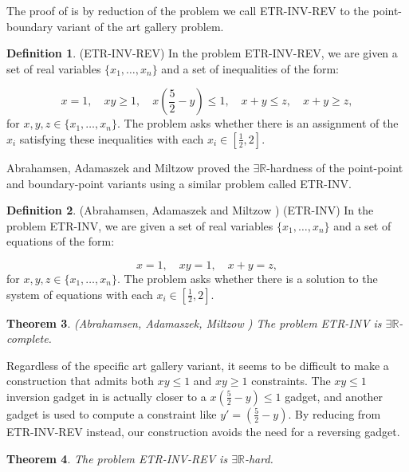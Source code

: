 \documentclass[11pt]{article}
\newcommand{\rr}{\mathbb R}
\theoremstyle{plain}
\newtheorem{theorem}{Theorem}
\theoremstyle{definition}
\newtheorem{definition}[theorem]{Definition}
\numberwithin{theorem}{section}
\begin{document}
The proof of  is by reduction of the problem we call ETR-INV-REV to the point-boundary variant of the art gallery problem.

\begin{definition}
(ETR-INV-REV) In the problem ETR-INV-REV, we are given a set of real variables $\{x_1, \dots, x_n\}$ and a set of inequalities of the form:

\[x=1,\quad xy\ge 1,\quad x\left(\frac52-y\right)\le 1,\quad x+y\le z,\quad x+y\ge z,\]
for $x, y, z\in \{x_1,\dots, x_n\}$. The problem asks whether there is an assignment of the $x_i$ satisfying these inequalities with each $x_i\in[\frac12, 2]$.
\end{definition}
Abrahamsen, Adamaszek and Miltzow \cite{ExistsRHardness} proved the $\exists\rr$-hardness of the point-point and boundary-point variants using a similar problem called ETR-INV.

\begin{definition}(Abrahamsen, Adamaszek and Miltzow \cite{ExistsRHardness})
(ETR-INV) In the problem ETR-INV, we are given a set of real variables $\{x_1, \dots, x_n\}$ and a set of equations of the form:

\[x=1,\quad xy=1,\quad x+y=z,\]
for $x, y, z\in \{x_1,\dots, x_n\}$. The problem asks whether there is a solution to the system of equations with each $x_i\in[\frac12, 2]$.
\end{definition}

\begin{theorem}(Abrahamsen, Adamaszek, Miltzow \cite{ExistsRHardness})
The problem ETR-INV is $\exists\rr$-complete.
\end{theorem}

Regardless of the specific art gallery variant, it seems to be difficult to make a construction that admits both $xy\le 1$ and $xy\ge 1$ constraints. The $xy\le 1$ inversion gadget in \cite{ExistsRHardness} is actually closer to a $x\left(\frac52-y\right)\le 1$ gadget, and another gadget is used to compute a constraint like $y'=\left(\frac52-y\right)$. By reducing from ETR-INV-REV instead, our construction avoids the need for a reversing gadget.

\begin{theorem}\label{ETRRevHardness}
The problem ETR-INV-REV is $\exists\rr$-hard.
\end{theorem}
\end{document}
